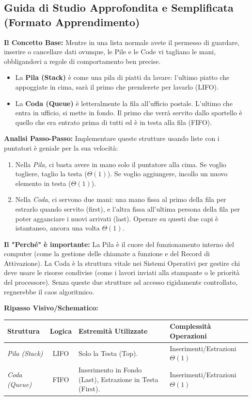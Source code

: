 \documentclass[a4paper, 11pt]{report}
\begin{document}
\vspace{0.5cm}
\subsection*{Guida di Studio Approfondita e Semplificata (Formato Apprendimento)}


\textbf{Il Concetto Base:}
Mentre in una lista normale avete il permesso di guardare, inserire o cancellare dati ovunque, le Pile e le Code vi tagliano le mani, obbligandovi a regole di comportamento ben precise.
\begin{itemize}
\item La \textbf{Pila (Stack)} è come una pila di piatti da lavare: l'ultimo piatto che appoggiate in cima, sarà il primo che prenderete per lavarlo (LIFO).
\item La \textbf{Coda (Queue)} è letteralmente la fila all'ufficio postale. L'ultimo che entra in ufficio, si mette in fondo. Il primo che verrà servito dallo sportello è quello che era entrato prima di tutti ed è in testa alla fila (FIFO).
\end{itemize}

\textbf{Analisi Passo-Passo:}
Implementare queste strutture usando liste con i puntatori è geniale per la sua velocità:
\begin{enumerate}
\item Nella \textit{Pila}, ci basta avere in mano solo il puntatore alla cima. Se voglio togliere, taglio la testa ($\Theta(1)$). Se voglio aggiungere, incollo un nuovo elemento in testa ($\Theta(1)$).
\item Nella \textit{Coda}, ci servono due mani: una mano fissa al primo della fila per estrarlo quando servito (first), e l'altra fissa all'ultima persona della fila per poter agganciare i nuovi arrivati (last). Operare su questi due capi è istantaneo, ancora una volta $\Theta(1)$.
\end{enumerate}

\textbf{Il "Perché" è importante:}
La Pila è il cuore del funzionamento interno del computer (come la gestione delle chiamate a funzione e del Record di Attivazione). La Coda è la struttura vitale nei Sistemi Operativi per gestire chi deve usare le risorse condivise (come i lavori inviati alla stampante o le priorità del processore). Senza queste due strutture ad accesso rigidamente controllato, regnerebbe il caos algoritmico.

\textbf{Ripasso Visivo/Schematico:}
\begin{center}
\begin{tabular}{|p{3cm}|c|p{4.5cm}|p{3.5cm}|}
\hline
\textbf{Struttura} & \textbf{Logica} & \textbf{Estremità Utilizzate} & \textbf{Complessità Operazioni} \\
\hline
\textit{Pila (Stack)} & LIFO & Solo la Testa (Top). & Inserimenti/Estrazioni $\Theta(1)$ \\
\hline
\textit{Coda (Queue)} & FIFO & Inserimento in Fondo (Last), Estrazione in Testa (First). & Inserimenti/Estrazioni $\Theta(1)$ \\
\hline
\end{tabular}
\end{center}
\end{document}
